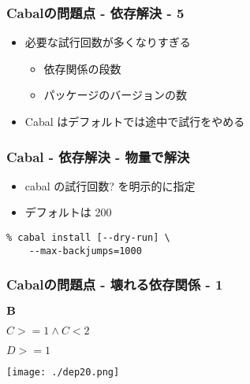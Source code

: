 \documentclass[cjk,dvipdfm,14pt]{beamer}
\begin{document}
\begin{frame}

\frametitle{Cabalの問題点 - 依存解決 - 5}

\begin{itemize}
\item 必要な試行回数が多くなりすぎる
  \begin{itemize}
  \item 依存関係の段数
  \item パッケージのバージョンの数
  \end{itemize}
\item Cabal はデフォルトでは途中で試行をやめる
\end{itemize}

\end{frame}

\begin{frame}[fragile]
\frametitle{Cabal - 依存解決 - 物量で解決}

\begin{itemize}
\item cabal の試行回数? を明示的に指定
\item デフォルトは 200
\end{itemize}

\begin{lstlisting}
% cabal install [--dry-run] \
    --max-backjumps=1000
\end{lstlisting}

\end{frame}


\begin{frame}
\frametitle{Cabalの問題点 - 壊れる依存関係 - 1}

\begin{description}
\item ${\bf B}$
\item
  \begin{description}
  \item $C >= 1 \wedge C < 2$
  \item $D >= 1$
  \end{description}
\end{description}

\texttt{[image: ./dep20.png]}

\end{frame}
\end{document}
